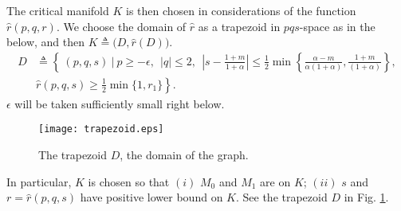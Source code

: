 \documentclass[a4paper,11pt]{article}
\theoremstyle{remark}
\begin{document}
The critical manifold $K$ is then chosen in considerations of the function $\hat{r}(p,q,r)$. We choose the domain of $\hat{r}$ as a trapezoid in $pqs$-space as in the below, and then $K\triangleq\big(D,\hat{r}(D)\big)$.
\begin{align*}
 D &\triangleq \left\{ \: (p,q,s) \: \Big| \:  p\ge-\epsilon, ~~ |q|\le2, ~~ \left|s-\frac{1+m}{1+\alpha}\right| \le \frac{1}{2}\min\left\{\frac{\alpha-m}{\alpha(1+\alpha)},\frac{1+m}{(1+\alpha)}\right\},\right.  \\
 &\left. \hat{r}(p,q,s)\ge \frac{1}{2}\min\{1,r_1\}\right\}.
\end{align*}
$\epsilon$ will be taken sufficiently small right below.
\begin{figure}[ht]
 \centering
  \texttt{[image: trapezoid.eps]}
  \caption{The trapezoid $D$, the domain of the graph.} \label{fig:D}
\end{figure}
In particular, $K$ is chosen so that $(i)$ $M_0$ and $M_1$ are on $K$; $(ii)$ $s$ and $r=\hat{r}(p,q,s)$ have positive lower bound on $K$. See the trapezoid $D$ in Fig. \ref{fig:D}. 
\end{document}
